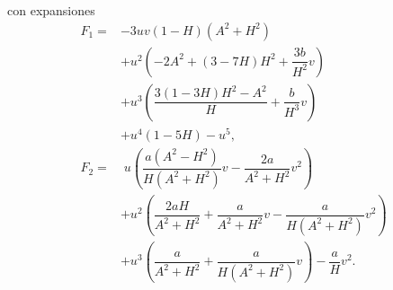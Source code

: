 
\noindent con expansiones
\begin{equation}
	\begin{aligned}
		F_1 = & -3uv(1 - H)(A^2 + H^2) \\
		& + u^2\left(-2A^2 + (3 - 7H)H^2 + \dfrac{3b}{H^2} v \right) \\ 
		& + u^3\left(\dfrac{3(1 - 3H)H^2 - A^2}{H} + \dfrac{b}{H^3} v \right) \\ 
		& + u^4(1 - 5H) - u^5, \\
		F_2 = & \; u \left(\dfrac{a(A^2 - H^2)}{H(A^2 + H^2)} v - \dfrac{2a}{A^2 + H^2} v^2 \right) \\
		& + u^2\left(\dfrac{2aH}{A^2 + H^2} + \dfrac{a}{A^2 + H^2} v - \dfrac{a}{H(A^2 + H^2)} v^2 \right) \\
		& + u^3\left( \dfrac{a}{A^2 + H^2} + \dfrac{a}{H(A^2 + H^2)} v \right) - \dfrac{a}{H} v^2.
	\end{aligned}
	\label{eq: expansionF1,2}
\end{equation}

